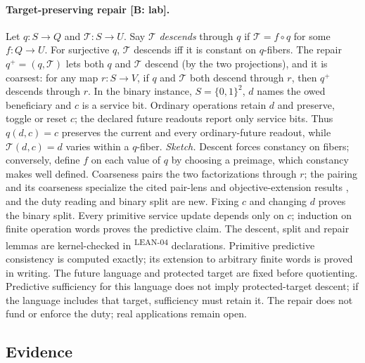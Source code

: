 \documentclass[pdflatex,sn-basic]{sn-jnl}%
\newcommand{\slot}[1]{}%
\newcommand{\rec}[1]{\ifannotated\textsuperscript{\textcolor{blue!60!black}{\tiny#1}}\fi}
\begin{document}
\begin{appendices}
\paragraph{Target-preserving repair [B: lab].} Let $q:S\to Q$ and $\mathcal T:S\to U$. Say $\mathcal T$ \emph{descends} through $q$ if $\mathcal T=f\circ q$ for some $f:Q\to U$. For surjective $q$, $\mathcal T$ descends iff it is constant on $q$-fibers. The repair $q^+=(q,\mathcal T)$ lets both $q$ and $\mathcal T$ descend (by the two projections), and it is coarsest: for any map $r:S\to V$, if $q$ and $\mathcal T$ both descend through $r$, then $q^+$ descends through $r$. In the binary instance, $S=\{0,1\}^2$, $d$ names the owed beneficiary and $c$ is a service bit. Ordinary operations retain $d$ and preserve, toggle or reset $c$; the declared future readouts report only service bits. Thus $q(d,c)=c$ preserves the current and every ordinary-future readout, while $\mathcal T(d,c)=d$ varies within a $q$-fiber. \emph{Sketch.} Descent forces constancy on fibers; conversely, define $f$ on each value of $q$ by choosing a preimage, which constancy makes well defined. Coarseness pairs the two factorizations through $r$; the pairing and its coarseness specialize the cited pair-lens and objective-extension results \citep{tsiokos2026f8,tsiokos2026f4}, and the duty reading and binary split are new. Fixing $c$ and changing $d$ proves the binary split. Every primitive service update depends only on $c$; induction on finite operation words proves the predictive claim. The descent, split and repair lemmas are kernel-checked in \numLeanCarrier\rec{LEAN-04} declarations. Primitive predictive consistency is computed exactly; its extension to arbitrary finite words is proved in writing. The future language and protected target are fixed before quotienting. Predictive sufficiency for this language does not imply protected-target descent; if the language includes that target, sufficiency must retain it. The repair does not fund or enforce the duty; real applications remain open.
\subsection{Evidence}\label{app:evidence}

\slot{A.3}

\end{appendices}
\end{document}
